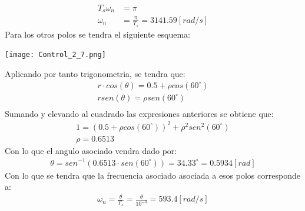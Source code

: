 \documentclass[
  11pt,
  letterpaper,
   addpoints,
   answers
  ]{exam}
\begin{document}
\begin{questions}
\begin{solution}
\begin{align}
    T_{s}\omega_{n} &= \pi\\
    \omega_{n} &= \frac{\pi}{T_{s}} = 3141.59[rad/s]
\end{align}
Para los otros polos se tendra el siguiente esquema:
\begin{center}
    \texttt{[image: Control\_2\_7.png]}
\end{center}
Aplicando por tanto trigonometria, se tendra que:
\begin{align}
    r\cdot cos(\theta)  = 0.5 + \rho cos(60^{\circ})\\
    rsen(\theta) = \rho sen(60^{\circ})\\
\end{align}
Sumando y elevando al cuadrado las expresiones anteriores se obtiene que:
\begin{align}
    1 = (0.5 + \rho cos(60^{\circ}))^{2} + \rho^{2}sen^{2}(60^{\circ})\\
    \rho = 0.6513
\end{align}
Con lo que el angulo asociado vendra dado por:
\begin{align}
    \theta = sen^{-1}(0.6513 \cdot sen(60^{\circ})) = 34.33^{\circ} = 0.5934[rad]
\end{align}
Con lo que se tendra que la frecuencia asociado asociada a esos polos corresponde a:
\begin{align}
    \omega_{n} = \frac{\theta}{T_{s}} = \frac{\theta}{10^{-3}} = 593.4[rad/s]
\end{align}

\end{solution}
\end{questions}
\end{document}
